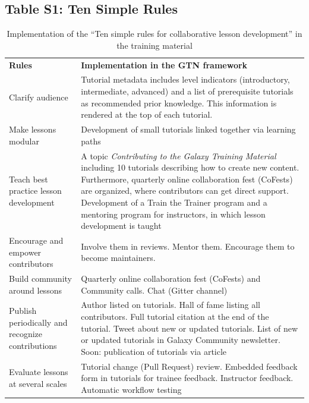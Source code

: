 \documentclass[10pt,letterpaper]{article}
\begin{document}
\subsection*{Table S1: Ten Simple Rules}
\begin{table}[!ht]
    \begin{adjustwidth}{-2in}{0in}
	\centering
	\caption{Implementation of the ``Ten simple rules for collaborative lesson development''\cite{Devenyi_2018} in the training material
    \label{tbl:tensimplerules}}
	\begin{tabular}{p{}p{}}
		\textbf{Rules}                                      & \textbf{Implementation in the GTN framework} \\
		Clarify audience                                    & Tutorial metadata includes level indicators (introductory, intermediate, advanced) and a list of prerequisite tutorials as recommended prior knowledge. This information is rendered at the top of each tutorial. \\
		Make lessons modular                                & Development of small tutorials linked together via learning paths \\
		Teach best practice lesson development              & A topic \emph{Contributing to the Galaxy Training Material} including 10 tutorials describing how to create new content. Furthermore, quarterly online collaboration fest (CoFests) are organized, where contributors can get direct support. Development of a Train the Trainer program and a mentoring program for instructors, in which lesson development is taught \\
		Encourage and empower contributors                  & Involve them in reviews. Mentor them. Encourage them to become maintainers. \\
		Build community around lessons                      & Quarterly online collaboration fest (CoFests) and Community calls. Chat (Gitter channel) \\
		Publish periodically and recognize contributions    & Author listed on tutorials. Hall of fame listing all contributors. Full tutorial citation at the end of the tutorial. Tweet about new or updated tutorials. List of new or updated tutorials in Galaxy Community newsletter. Soon: publication of tutorials via article \\
		Evaluate lessons at several scales                  & Tutorial change (Pull Request) review. Embedded feedback form in tutorials for trainee feedback. Instructor feedback. Automatic workflow testing \\

\end{tabular}
\end{adjustwidth}
\end{table}
\end{document}
